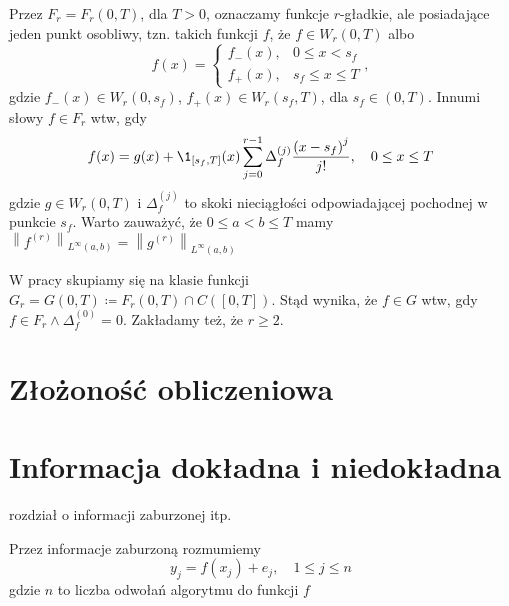 \documentclass[oik, pdftex, robocza, man]{mgrwms}
\begin{document}
Przez $F_{r} = F_{r}(0, T)$, dla $T > 0$, oznaczamy funkcje $r$-gładkie, ale posiadające jeden punkt osobliwy, tzn. takich funkcji $f$, że $f \in W_{r}(0,T)$ albo
\begin{equation*}
    f(x)= \begin{cases}f_{-}(x), & 0 \leq x<s_{f} \\ f_{+}(x), & s_{f} \leq x \leq T\end{cases},
\end{equation*}
gdzie $f_{-}(x) \in W_{r}(0, s_{f})$, $f_{+}(x) \in W_{r}(s_{f}, T)$, dla $s_{f} \in (0,T)$. Innumi słowy $f \in F_{r}$ wtw, gdy
\begin{equation*}
    f(x)=g(x)+\1_{\left[s_{f}, T\right]}(x) \sum_{j=0}^{r-1} \Delta_{f}^{(j)} \frac{\left(x-s_{f}\right)^{j}}{j !}, \quad 0 \leq x \leq T
\end{equation*}
gdzie $g \in W_{r}(0,T)$ i $\Delta_{f}^{(j)}$ to skoki nieciągłości odpowiadającej pochodnej w punkcie $s_{f}$. Warto zauważyć, że 
$0 \leq a<b \leq T$ mamy $\left\|f^{(r)}\right\|_{L^{\infty}(a, b)}=\left\|g^{(r)}\right\|_{L^{\infty}(a, b)}$

W pracy \cite{UA} skupiamy się na klasie funkcji $G_{r} = G(0,T) \coloneqq F_{r}(0,T) \cap C([0,T])$. Stąd wynika, że $f \in G$ wtw, gdy $f \in F_{r} \land \Delta_{f}^{(0)} = 0$.
Zakładamy też, że $r \geq 2$.






\mgrclosechapter


\chapter{Złożoność obliczeniowa}



\mgrclosechapter



\chapter{Informacja dokładna i niedokładna}

\noindent
rozdział o informacji zaburzonej itp.

Przez informacje zaburzoną rozmumiemy
\begin{equation*}
    y_j = f(x_j) + e_j, \quad 1 \leq j \leq n
\end{equation*}
gdzie $n$ to liczba odwołań algorytmu do funkcji $f$
\end{document}
